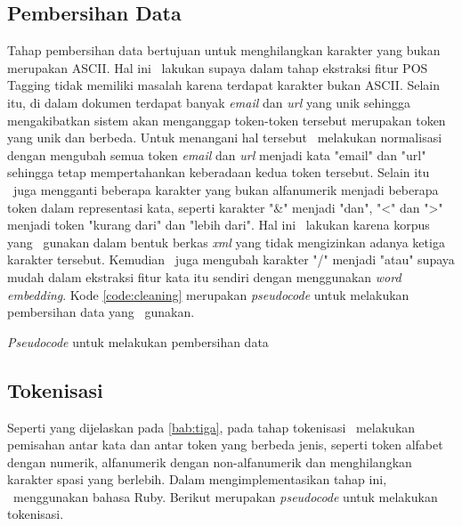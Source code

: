 \subsection{Pembersihan Data}
Tahap pembersihan data bertujuan untuk menghilangkan karakter yang bukan merupakan ASCII. Hal ini \saya~lakukan supaya dalam tahap ekstraksi fitur POS Tagging tidak memiliki masalah karena terdapat karakter bukan ASCII. Selain itu, di dalam dokumen terdapat banyak \textit{email} dan \textit{url} yang unik sehingga mengakibatkan sistem akan menganggap token-token tersebut merupakan token yang unik dan berbeda. Untuk menangani hal tersebut \saya~melakukan normalisasi dengan mengubah semua token \textit{email} dan \textit{url} menjadi kata "email" dan "url" sehingga tetap mempertahankan keberadaan kedua token tersebut. Selain itu \saya~juga mengganti beberapa karakter yang bukan alfanumerik menjadi beberapa token dalam representasi kata, seperti karakter "\&" menjadi "dan", "\textless" dan "\textgreater" menjadi token "kurang dari" dan "lebih dari". Hal ini \saya~lakukan karena korpus yang \saya~gunakan dalam bentuk berkas \textit{xml} yang tidak mengizinkan adanya ketiga karakter tersebut. Kemudian \saya~juga mengubah karakter "/" menjadi "atau" supaya mudah dalam ekstraksi fitur kata itu sendiri dengan menggunakan \textit{word embedding}. Kode \ref{code:cleaning} merupakan \textit{pseudocode} untuk melakukan pembersihan data yang \saya~gunakan.


\begin{kode}
	
	
	\caption{\textit{Pseudocode} untuk melakukan pembersihan data}
	\label{code:cleaning}
\end{kode}

\subsection{Tokenisasi}
Seperti yang dijelaskan pada \ref{bab:tiga}, pada tahap tokenisasi \saya~melakukan pemisahan antar kata dan antar token yang berbeda jenis, seperti token alfabet dengan numerik, alfanumerik dengan non-alfanumerik dan menghilangkan karakter spasi yang berlebih. Dalam mengimplementasikan tahap ini, \saya~menggunakan bahasa Ruby. Berikut merupakan \textit{pseudocode} untuk melakukan tokenisasi.

